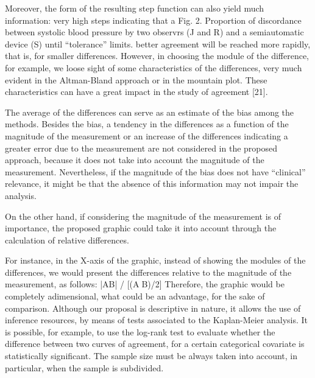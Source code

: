 Moreover, the form of the resulting step function can also yield much information: very high steps indicating that a
Fig. 2. Proportion of discordance between systolic blood pressure by two observrs (J and R) and a semiautomatic device (S) until “tolerance” limits.
better agreement will be reached more rapidly, that is, for smaller differences. However, in choosing the module of the difference,
for example, we loose sight of some characteristics of the differences, very much evident in the Altman-Bland
approach or in the mountain plot. These characteristics can have a great impact in the study of agreement [21]. 

The average of the differences can serve as an estimate of the bias among the methods. Besides the bias, a tendency in the
differences as a function of the magnitude of the measurement or an increase of the differences indicating a greater
error due to the measurement are not considered in the proposed approach, because it does not take into account
the magnitude of the measurement. Nevertheless, if the magnitude of the bias does not have “clinical” relevance, it
might be that the absence of this information may not impair the analysis.

On the other hand, if considering the magnitude of the measurement is of importance, the proposed graphic could
take it into account through the calculation of relative differences.

For instance, in the X-axis of the graphic, instead of showing the modules of the differences, we would present the
differences relative to the magnitude of the measurement,
as follows:
|AB| / [(AB)/2]
Therefore, the graphic would be completely adimensional, what could be an advantage, for the sake of comparison.
Although our proposal is descriptive in nature, it allows the use of inference resources, by means of tests associated to
the Kaplan-Meier analysis. It is possible, for example, to use the log-rank test to evaluate whether the difference between
two curves of agreement, for a certain categorical covariate is statistically significant. The sample size must
be always taken into account, in particular, when the sample is subdivided.
